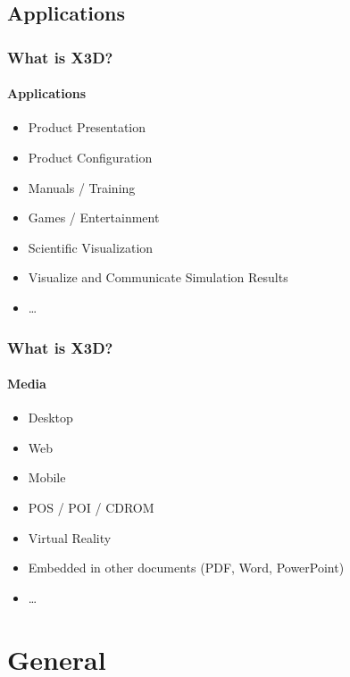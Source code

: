 \documentclass[t]{beamer}
\begin{document}
  
  \subsection{Applications}
  
 \begin{frame}
 \frametitle{What is X3D?}
\framesubtitle{Applications}
\begin{itemize}
  \item Product Presentation
  \item Product Configuration
  \item Manuals / Training
  \item Games / Entertainment
  \item Scientific Visualization 
  \item Visualize and Communicate Simulation Results
  \item \dots
\end{itemize}
 \end{frame}
  
    
 \begin{frame}
 \frametitle{What is X3D?}
\framesubtitle{Media}
\begin{itemize}
  \item Desktop
  \item Web
  \item Mobile
  \item POS / POI / CDROM
  \item Virtual Reality
  \item Embedded in other documents (PDF, Word, PowerPoint)
  \item \dots
\end{itemize}
 \end{frame}
  
  \section{General}
\end{document}
